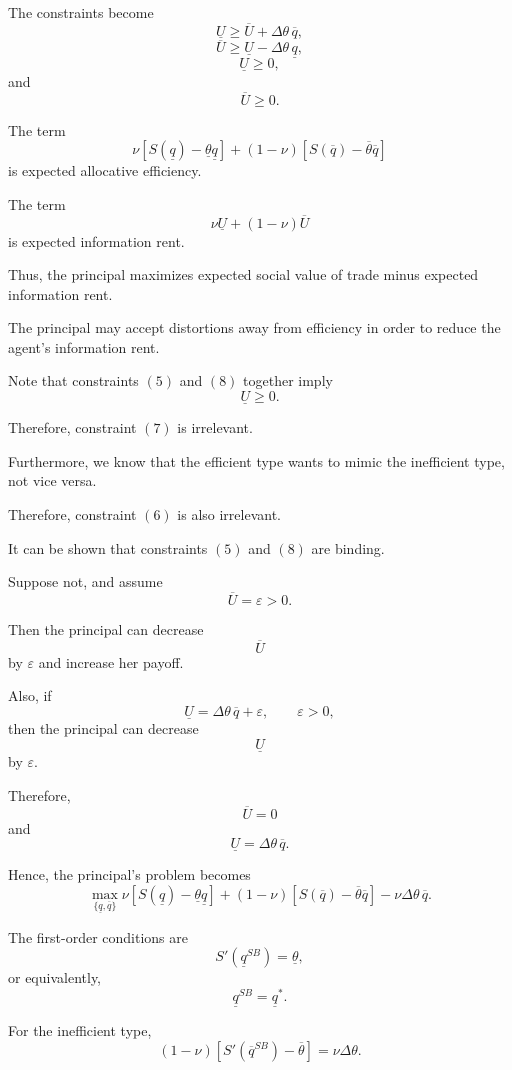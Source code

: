 The constraints become
\[
\underline U
\ge
\overline U+\Delta\theta\,\overline q,
\]
\[
\overline U
\ge
\underline U-\Delta\theta\,\underline q,
\]
\[
\underline U\ge 0,
\]
and
\[
\overline U\ge 0.
\]

The term
\[
\nu
\left[
S(\underline q)-\underline{\theta}\underline q
\right]
+
(1-\nu)
\left[
S(\overline q)-\overline{\theta}\overline q
\right]
\]
is expected allocative efficiency.

The term
\[
\nu\underline U+(1-\nu)\overline U
\]
is expected information rent.

Thus, the principal maximizes expected social value of trade minus expected information rent.

The principal may accept distortions away from efficiency in order to reduce the agent's information rent.




Note that constraints \((5)\) and \((8)\) together imply
\[
\underline U\ge 0.
\]

Therefore, constraint \((7)\) is irrelevant.

Furthermore, we know that the efficient type wants to mimic the inefficient type, not vice versa.

Therefore, constraint \((6)\) is also irrelevant.

It can be shown that constraints \((5)\) and \((8)\) are binding.

Suppose not, and assume
\[
\overline U=\varepsilon>0.
\]

Then the principal can decrease
\[
\overline U
\]
by \(\varepsilon\) and increase her payoff.

Also, if
\[
\underline U
=
\Delta\theta\,\overline q+\varepsilon,
\qquad
\varepsilon>0,
\]
then the principal can decrease
\[
\underline U
\]
by \(\varepsilon\).

Therefore,
\[
\overline U=0
\]
and
\[
\underline U=\Delta\theta\,\overline q.
\]

Hence, the principal's problem becomes
\[
\max_{\{\underline q,\overline q\}}
\nu
\left[
S(\underline q)-\underline{\theta}\underline q
\right]
+
(1-\nu)
\left[
S(\overline q)-\overline{\theta}\overline q
\right]
-
\nu\Delta\theta\,\overline q.
\]

The first-order conditions are
\[
S'(\underline q^{SB})
=
\underline{\theta},
\]
or equivalently,
\[
\underline q^{SB}=\underline q^*.
\]

For the inefficient type,
\[
(1-\nu)
\left[
S'(\overline q^{SB})-\overline{\theta}
\right]
=
\nu\Delta\theta.
\]

